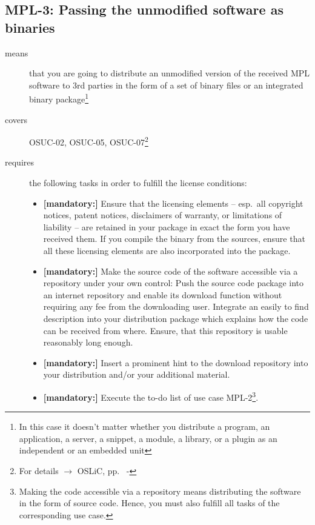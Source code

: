 \subsection{MPL-3: Passing the unmodified software as binaries} 

\begin{description}
\item[means] that you are going to distribute an unmodified version of the
received MPL software to 3rd parties in the form of a set of binary files or an
integrated bi\-na\-ry package\footnote{In this case it doesn't matter
whether you  distribute a program, an application, a server, a snippet, a
module, a library, or a plugin as an independent or an embedded unit}

\item[covers] OSUC-02, OSUC-05, OSUC-07\footnote{For details $\rightarrow$ OSLiC, pp.\
\pageref{OSUC-02-DEF} - \pageref{OSUC-07-DEF}}

\item[requires] the following tasks in order to fulfill the license conditions:
\begin{itemize}
  
  \item \textbf{[mandatory:]} Ensure that the licensing elements -- esp.\ all
  copyright notices, patent notices, disclaimers of warranty, or limitations of
  liability -- are retained in your package in exact the form you have received
  them. If you compile the binary from the sources, ensure that all these
  licensing elements are also incorporated into the package.
  
  \item \textbf{[mandatory:]} Make the source code of the software accessible
  via a repository under your own control: Push the source code package into an
  internet repository and enable its download function without requiring any fee
  from the downloading user. Integrate an easily to find description into your
  distribution package which explains how the code can be received from where.
  Ensure, that this repository is usable reasonably long enough.
  
  \item \textbf{[mandatory:]} Insert a prominent hint to the download repository
  into your distribution and/or your additional material.
  
  \item \textbf{[mandatory:]} Execute the to-do list of use case MPL-2\footnote{
  Making the code accessible via a repository means distributing the software in
  the form of source code. Hence, you must also fulfill all tasks of the
  corresponding use case.}.
  

\end{itemize}
\end{description}
